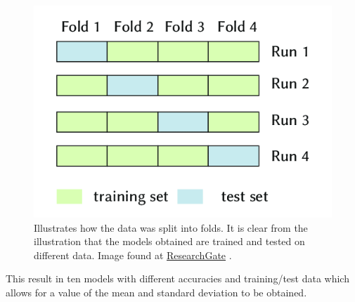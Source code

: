 \documentclass[11pt, fleqn, titlepage]{article}
\begin{document}
	\begin{figure}[H]
		\centering
		\includegraphics[width=0.4\linewidth]{imgs/kfolds}
		\caption{Illustrates how the data was split into folds. It is clear from the illustration that the models obtained are trained and tested on different data. Image found at \href{https://www.researchgate.net/figure/The-technique-of-KFold-cross-validation-illustrated-here-for-the-case-K-4-involves_fig10_278826818}{ResearchGate} \cite{researchgate}. }
		\label{fig:kfolds}
	\end{figure}
	\noindent
	This result in ten models with different accuracies and training/test data which allows for a value of the mean and standard deviation to be obtained.
	
\end{document}
